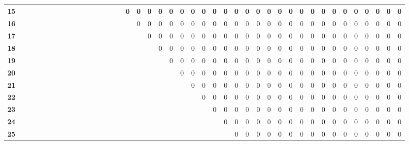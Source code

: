 \documentclass{article}
\begin{document}
\begin{table}[!ht]
\begin{adjustwidth}{-3cm}{-3cm}
\begin{tabular}{c||c|c|c|c|c|c|c|c|c|c|c|c|c|c|c|c|c|c|c|c|c|c|c|c|c|c|c|c|c|c|c|c|c|c|c|c|c|c|c|c|c|}
\multicolumn{1}{|c||}{\cellcolor{gray90}\textbf{15}} &  &  &  &  &  &  &  &  &  &  &  &  &  &  &  & 0 & 0 & 0 & 0 & 0 & 0 & 0 & 0 & 0 & 0 & 0 & 0 & 0 & 0 & 0 & 0 & 0 & 0 & 0 & 0 & 0 & 0 & 0 & 0 & 0 & 0 \\ \hline
\multicolumn{1}{|c||}{\cellcolor{gray90}\textbf{16}} &  &  &  &  &  &  &  &  &  &  &  &  &  &  &  &  & 0 & 0 & 0 & 0 & 0 & 0 & 0 & 0 & 0 & 0 & 0 & 0 & 0 & 0 & 0 & 0 & 0 & 0 & 0 & 0 & 0 & 0 & 0 & 0 & 0 \\ \hline
\multicolumn{1}{|c||}{\cellcolor{gray90}\textbf{17}} &  &  &  &  &  &  &  &  &  &  &  &  &  &  &  &  &  & 0 & 0 & 0 & 0 & 0 & 0 & 0 & 0 & 0 & 0 & 0 & 0 & 0 & 0 & 0 & 0 & 0 & 0 & 0 & 0 & 0 & 0 & 0 & 0 \\ \hline
\multicolumn{1}{|c||}{\cellcolor{gray90}\textbf{18}} &  &  &  &  &  &  &  &  &  &  &  &  &  &  &  &  &  &  & 0 & 0 & 0 & 0 & 0 & 0 & 0 & 0 & 0 & 0 & 0 & 0 & 0 & 0 & 0 & 0 & 0 & 0 & 0 & 0 & 0 & 0 & 0 \\ \hline
\multicolumn{1}{|c||}{\cellcolor{gray90}\textbf{19}} &  &  &  &  &  &  &  &  &  &  &  &  &  &  &  &  &  &  &  & 0 & 0 & 0 & 0 & 0 & 0 & 0 & 0 & 0 & 0 & 0 & 0 & 0 & 0 & 0 & 0 & 0 & 0 & 0 & 0 & 0 & 0 \\ \hline
\multicolumn{1}{|c||}{\cellcolor{gray90}\textbf{20}} &  &  &  &  &  &  &  &  &  &  &  &  &  &  &  &  &  &  &  &  & 0 & 0 & 0 & 0 & 0 & 0 & 0 & 0 & 0 & 0 & 0 & 0 & 0 & 0 & 0 & 0 & 0 & 0 & 0 & 0 & 0 \\ \hline
\multicolumn{1}{|c||}{\cellcolor{gray90}\textbf{21}} &  &  &  &  &  &  &  &  &  &  &  &  &  &  &  &  &  &  &  &  &  & 0 & 0 & 0 & 0 & 0 & 0 & 0 & 0 & 0 & 0 & 0 & 0 & 0 & 0 & 0 & 0 & 0 & 0 & 0 & 0 \\ \hline
\multicolumn{1}{|c||}{\cellcolor{gray90}\textbf{22}} &  &  &  &  &  &  &  &  &  &  &  &  &  &  &  &  &  &  &  &  &  &  & 0 & 0 & 0 & 0 & 0 & 0 & 0 & 0 & 0 & 0 & 0 & 0 & 0 & 0 & 0 & 0 & 0 & 0 & 0 \\ \hline
\multicolumn{1}{|c||}{\cellcolor{gray90}\textbf{23}} &  &  &  &  &  &  &  &  &  &  &  &  &  &  &  &  &  &  &  &  &  &  &  & 0 & 0 & 0 & 0 & 0 & 0 & 0 & 0 & 0 & 0 & 0 & 0 & 0 & 0 & 0 & 0 & 0 & 0 \\ \hline
\multicolumn{1}{|c||}{\cellcolor{gray90}\textbf{24}} &  &  &  &  &  &  &  &  &  &  &  &  &  &  &  &  &  &  &  &  &  &  &  &  & 0 & 0 & 0 & 0 & 0 & 0 & 0 & 0 & 0 & 0 & 0 & 0 & 0 & 0 & 0 & 0 & 0 \\ \hline
\multicolumn{1}{|c||}{\cellcolor{gray90}\textbf{25}} &  &  &  &  &  &  &  &  &  &  &  &  &  &  &  &  &  &  &  &  &  &  &  &  &  & 0 & 0 & 0 & 0 & 0 & 0 & 0 & 0 & 0 & 0 & 0 & 0 & 0 & 0 & 0 & 0 \\ \hline

\end{tabular}
\end{adjustwidth}
\end{table}
\end{document}
